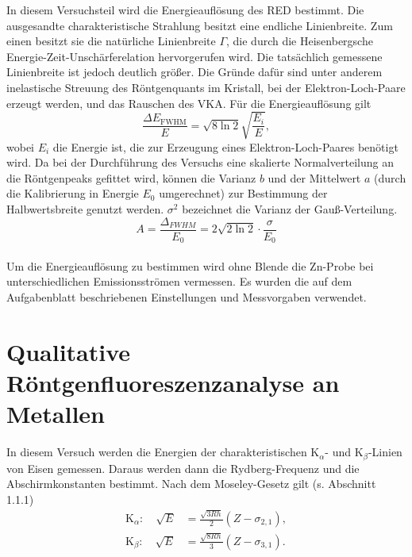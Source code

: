 In diesem Versuchsteil wird die Energieauflösung des RED bestimmt. Die ausgesandte charakteristische Strahlung besitzt eine endliche Linienbreite. Zum einen besitzt sie die natürliche Linienbreite $\Gamma$, die durch die Heisenbergsche Energie-Zeit-Unschärferelation hervorgerufen wird.
Die tatsächlich gemessene Linienbreite ist jedoch deutlich größer. Die Gründe dafür sind unter anderem inelastische Streuung des Röntgenquants im Kristall, bei der Elektron-Loch-Paare erzeugt werden, und das Rauschen des VKA.
Für die Energieauflösung gilt \cite{litmap} %
\begin{equation}
 \frac{\Delta E_{\textrm{FWHM}}}{E} = \sqrt{8\ln2}\sqrt{\frac{E_{i}}{E}},
\end{equation}
wobei $E_{i}$ die Energie ist, die zur Erzeugung eines Elektron-Loch-Paares benötigt wird. Da bei der Durchführung des Versuchs eine skalierte Normalverteilung an die Röntgenpeaks gefittet wird, können die Varianz $b$ und der Mittelwert $a$ (durch die Kalibrierung in Energie $E_0$ umgerechnet) zur Bestimmung der Halbwertsbreite genutzt werden. $\sigma^2$ bezeichnet die Varianz der Gauß-Verteilung.
\begin{equation}
	A = \frac{\Delta_{FWHM}}{E_0} = 2\sqrt{2\ln 2}\cdot\frac{\sigma}{E_0}
	\label{eq:aufloesung}
\end{equation}\\
Um die Energieauflösung zu bestimmen wird ohne Blende die Zn-Probe bei unterschiedlichen Emissionsströmen vermessen. Es wurden die auf dem Aufgabenblatt beschriebenen Einstellungen und Messvorgaben verwendet.\\

\section{Qualitative Röntgenfluoreszenzanalyse an Metallen}

In diesem Versuch werden die Energien der charakteristischen K$_{\alpha}$- und K$_{\beta}$-Linien von Eisen gemessen. Daraus werden dann die Rydberg-Frequenz und die Abschirmkonstanten bestimmt.
Nach dem Moseley-Gesetz gilt (s. Abschnitt 1.1.1)
\begin{align}
 \textrm{K}_{\alpha}: \quad \sqrt{E} &= \frac{\sqrt{3Rh}}{2}\left(Z-\sigma_{2,1}\right), \\ 
 \textrm{K}_{\beta}: \quad \sqrt{E} &= \frac{\sqrt{8Rh}}{3}\left(Z-\sigma_{3,1}\right).
\end{align}

